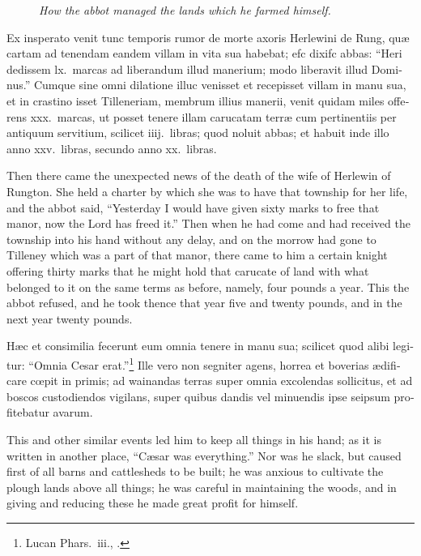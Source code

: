 \documentclass{book}
\newcommand{\blockhead}[4][]{
\begin{figure}
\centering
\vspace{#4}
\parbox{2.75cm}{\begin{center}\footnotesize \color{BrickRed} \emph{#2}\\ #1 \end{center}}
\end{figure}
}
\begin{document}
\begin{paracol}{2}
\switchcolumn*

\begin{otherlanguage}{latin}
\blockhead{How the abbot managed the lands which he farmed himself.}{4}{-0.45cm}
Ex insperato venit tunc temporis rumor de morte axoris Herlewini de Rung, qu\ae{} cartam ad tenendam eandem villam in vita sua habebat; efc dixifc abbas: ``Heri dedissem lx.\ marcas ad liberandum illud manerium; modo liberavit illud Dominus.'' Cumque sine omni dilatione illuc venisset et recepisset villam in manu sua, et in crastino isset Tilleneriam, membrum illius manerii, venit quidam miles offerens xxx.\ marcas, ut posset tenere illam carucatam terr\ae{} cum pertinentiis per antiquum servitium, scilicet iiij.\ libras; quod noluit abbas; et habuit inde illo anno xxv.\ libras, secundo anno xx.\ libras.

\end{otherlanguage}

\switchcolumn

Then there came the unexpected news of the death of the wife of Herlewin of Rungton. She held a charter by which she was to have that township for her life, and the abbot said, ``Yesterday I would have given sixty marks to free that manor, now the Lord has freed it.'' Then when he had come and had received the township into his hand without any delay, and on the morrow had gone to Tilleney which was a part of that manor, there came to him a certain knight offering thirty marks that he might hold that carucate of land with what belonged to it on the same terms as before, namely, four pounds a year. This the abbot refused, and he took thence that year five and twenty pounds, and in the next year twenty pounds.

\switchcolumn*

\begin{otherlanguage}{latin}
H\ae{}c et consimilia fecerunt eum omnia tenere in manu sua; scilicet quod alibi legitur: ``Omnia Cesar erat.''\footnote[\textdagger]{Lucan Phars.\ iii., .} Ille vero non segniter agens, horrea et boverias \ae{}dificare c\oe{}pit in primis; ad wainandas terras super omnia excolendas sollicitus, et ad boscos custodiendos vigilans, super quibus dandis vel minuendis ipse seipsum profitebatur avarum.
\end{otherlanguage}

\switchcolumn

This and other similar events led him to keep all things in his hand; as it is written in another place, ``C\ae{}sar was everything.'' Nor was he slack, but caused first of all barns and cattlesheds to be built; he was anxious to cultivate the plough lands above all things; he was careful in maintaining the woods, and in giving and reducing these he made great profit for himself.


\end{paracol}
\end{document}
